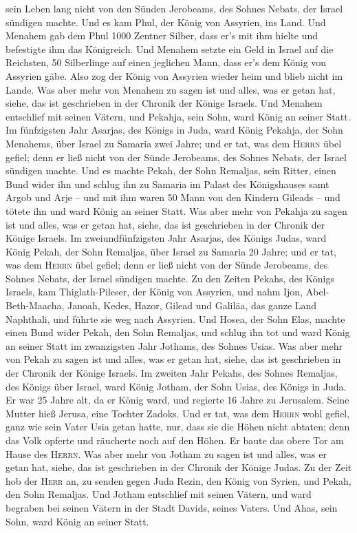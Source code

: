 sein Leben lang nicht von den Sünden Jerobeams, des Sohnes Nebats, der
Israel sündigen machte.  Und es kam Phul, der König von
Assyrien, ins Land. Und Menahem gab dem Phul 1000 Zentner Silber, dass
er's mit ihm hielte und befestigte ihm das Königreich. 
Und Menahem setzte ein Geld in Israel auf die Reichsten, 50 Silberlinge
auf einen jeglichen Mann, dass er's dem König von Assyrien gäbe. Also
zog der König von Assyrien wieder heim und blieb nicht im Lande.
 Was aber mehr von Menahem zu sagen ist und alles, was er
getan hat, siehe, das ist geschrieben in der Chronik der Könige Israels.
 Und Menahem entschlief mit seinen Vätern, und Pekahja,
sein Sohn, ward König an seiner Statt.  Im fünfzigsten
Jahr Asarjas, des Königs in Juda, ward König Pekahja, der Sohn Menahems,
über Israel zu Samaria zwei Jahre;  und er tat, was dem
\textsc{Herrn} übel gefiel; denn er ließ nicht von der Sünde Jerobeams,
des Sohnes Nebats, der Israel sündigen machte.  Und es
machte Pekah, der Sohn Remaljas, sein Ritter, einen Bund wider ihn und
schlug ihn zu Samaria im Palast des Königshauses samt Argob und Arje --
und mit ihm waren 50 Mann von den Kindern Gileads -- und tötete ihn und
ward König an seiner Statt.  Was aber mehr von Pekahja zu
sagen ist und alles, was er getan hat, siehe, das ist geschrieben in der
Chronik der Könige Israels.  Im zweiundfünfzigsten Jahr
Asarjas, des Königs Judas, ward König Pekah, der Sohn Remaljas, über
Israel zu Samaria 20 Jahre;  und er tat, was dem
\textsc{Herrn} übel gefiel; denn er ließ nicht von der Sünde Jerobeams,
des Sohnes Nebats, der Israel sündigen machte.  Zu den
Zeiten Pekahs, des Königs Israels, kam Thiglath-Pileser, der König von
Assyrien, und nahm Ijon, Abel-Beth-Maacha, Janoah, Kedes, Hazor, Gilead
und Galiläa, das ganze Land Naphthali, und führte sie weg nach Assyrien.
 Und Hosea, der Sohn Elas, machte einen Bund wider Pekah,
den Sohn Remaljas, und schlug ihn tot und ward König an seiner Statt im
zwanzigsten Jahr Jothams, des Sohnes Usias.  Was aber
mehr von Pekah zu sagen ist und alles, was er getan hat, siehe, das ist
geschrieben in der Chronik der Könige Israels.  Im
zweiten Jahr Pekahs, des Sohnes Remaljas, des Königs über Israel, ward
König Jotham, der Sohn Usias, des Königs in Juda.  Er war
25 Jahre alt, da er König ward, und regierte 16 Jahre zu Jerusalem.
Seine Mutter hieß Jerusa, eine Tochter Zadoks.  Und er
tat, was dem \textsc{Herrn} wohl gefiel, ganz wie sein Vater Usia getan
hatte,  nur, dass sie die Höhen nicht abtaten; denn das
Volk opferte und räucherte noch auf den Höhen. Er baute das obere Tor am
Hause des \textsc{Herrn}.  Was aber mehr von Jotham zu
sagen ist und alles, was er getan hat, siehe, das ist geschrieben in der
Chronik der Könige Judas.  Zu der Zeit hob der
\textsc{Herr} an, zu senden gegen Juda Rezin, den König von Syrien, und
Pekah, den Sohn Remaljas.  Und Jotham entschlief mit
seinen Vätern, und ward begraben bei seinen Vätern in der Stadt Davids,
seines Vaters.  Und Ahas, sein Sohn, ward König an seiner
Statt.

